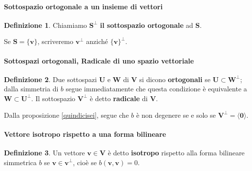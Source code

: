 \documentclass{article}
\theoremstyle{plain}
\theoremstyle{definition}
\newtheorem{defn}{Definizione}[section]
\theoremstyle{remark}
\begin{document}
\vspace{10pt}

\paragraph{Sottospazio ortogonale a un insieme di vettori}
\begin{bxthm}
\begin{defn}
Chiamiamo $\mathbf{S}^{\perp}$ \textbf{il sottospazio ortogonale} ad $\mathbf{S}$.     
\end{defn}
\end{bxthm}

\vspace{10pt}

Se $\mathbf{S} = \{\mathbf{v}\}$, scriveremo $\mathbf{v}^{\perp}$ anziché $\{\mathbf{v}\}^{\perp}$.

\vspace{10pt}

\paragraph{Sottospazi ortogonali, Radicale di uno spazio vettoriale} 
\begin{bxthm}
\begin{defn}
Due sottospazi $\mathbf{U}$ e $\mathbf{W}$ di $\mathbf{V}$ si dicono \textbf{ortogonali} se $\mathbf{U} \subset \mathbf{W}^{\perp}$; 
dalla simmetria di $b$ segue immediatamente che questa condizione è equivalente a $\mathbf{W} \subset \mathbf{U}^{\perp}$. 
Il sottospazio $\mathbf{V}^{\perp}$ è detto \textbf{radicale} di $\mathbf{V}$.     
\end{defn}
\end{bxthm}

\vspace{10pt}

Dalla proposizione \ref{quindicisei}, segue che $b$ è non degenere se e solo se $\mathbf{V}^{\perp} = \langle \mathbf{0} \rangle$.

\vspace{10pt}

\paragraph{Vettore isotropo rispetto a una forma bilineare}
\begin{bxthm}
\begin{defn}
Un vettore $\mathbf{v}\in\mathbf{V}$ è detto \textbf{isotropo} rispetto alla forma bilineare simmetrica $b$ se 
$\mathbf{v} \in \mathbf{v}^{\perp}$, cioè se $b(\mathbf{v}, \mathbf{v}) = 0$.     
\end{defn}
\end{bxthm}
\end{document}
